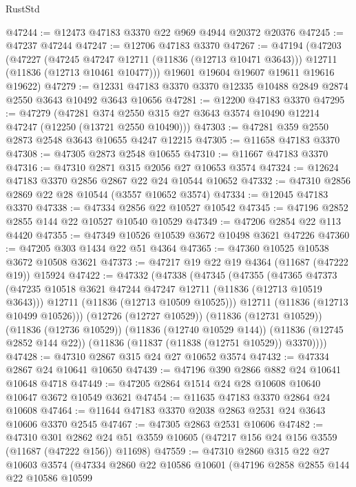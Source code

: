 \begin{lexlean}{RustStd}
\begin{coremodule}
@47244 := @12473 @47183 @3370 @22 @969 @4944 @20372 @20376
@47245 := @47237 @47244
@47247 := @12706 @47183 @3370
@47267 := @47194
    (@47203
      (@47227
        (@47245 @47247 @12711 (@11836 (@12713 @10471 @3643)))
        @12711
        (@11836 (@12713 @10461 @10477)))
      @19601
      @19604
      @19607
      @19611
      @19616
      @19622)
@47279 := @12331 @47183 @3370 @3370 @12335 @10488 @2849 @2874 @2550 @3643 @10492 @3643 @10656
@47281 := @12200 @47183 @3370
@47295 := @47279
    (@47281 @374 @2550 @315 @27 @3643 @3574 @10490 @12214 @47247 (@12250 (@13721 @2550 @10490)))
@47303 := @47281 @359 @2550 @2873 @2548 @3643 @10655 @4247 @12215
@47305 := @11658 @47183 @3370
@47308 := @47305 @2873 @2548 @10655
@47310 := @11667 @47183 @3370
@47316 := @47310 @2871 @315 @2056 @27 @10653 @3574
@47324 := @12624 @47183 @3370 @2856 @2867 @22 @24 @10544 @10652
@47332 := @47310 @2856 @2869 @22 @28 @10544 (@3557 @10652 @3574)
@47334 := @12045 @47183 @3370
@47338 := @47334 @2856 @22 @10527 @10542
@47345 := @47196 @2852 @2855 @144 @22 @10527 @10540 @10529
@47349 := @47206 @2854 @22 @113 @4420
@47355 := @47349 @10526 @10539 @3672 @10498 @3621 @47226
@47360 := @47205 @303 @1434 @22 @51 @4364
@47365 := @47360 @10525 @10538 @3672 @10508 @3621
@47373 := @47217 @19 @22 @19 @4364 (@11687 (@47222 @19)) @15924
@47422 := @47332
    (@47338
      (@47345
        (@47355
          (@47365
            @47373
            (@47235 @10518 @3621 @47244 @47247 @12711 (@11836 (@12713 @10519 @3643)))
            @12711
            (@11836 (@12713 @10509 @10525)))
          @12711
          (@11836 (@12713 @10499 @10526)))
        (@12726 (@12727 @10529))
        (@11836 (@12731 @10529))
        (@11836 (@12736 @10529))
        (@11836 (@12740 @10529 @144))
        (@11836 (@12745 @2852 @144 @22))
        (@11836 (@11837 (@11838 (@12751 @10529)) @3370))))
@47428 := @47310 @2867 @315 @24 @27 @10652 @3574
@47432 := @47334 @2867 @24 @10641 @10650
@47439 := @47196 @390 @2866 @882 @24 @10641 @10648 @4718
@47449 := @47205 @2864 @1514 @24 @28 @10608 @10640 @10647 @3672 @10549 @3621
@47454 := @11635 @47183 @3370 @2864 @24 @10608
@47464 := @11644 @47183 @3370 @2038 @2863 @2531 @24 @3643 @10606 @3370 @2545
@47467 := @47305 @2863 @2531 @10606
@47482 := @47310
    @301
    @2862
    @24
    @51
    @3559
    @10605
    (@47217 @156 @24 @156 @3559 (@11687 (@47222 @156)) @11698)
@47559 := @47310
    @2860
    @315
    @22
    @27
    @10603
    @3574
    (@47334
      @2860
      @22
      @10586
      @10601
      (@47196
        @2858
        @2855
        @144
        @22
        @10586
        @10599

\end{coremodule}
\end{lexlean}
